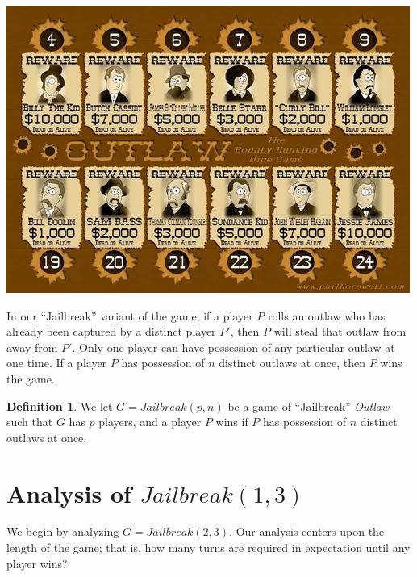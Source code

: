 \documentclass{article}
\theoremstyle{definition}
\newtheorem{defn}{Definition}
\theoremstyle{plain}
\begin{document}
	\begin{center}
	\includegraphics[scale=0.5]{outlaw_board}
	\end{center}
	
	In our ``Jailbreak'' variant of the game, if a player $P$ rolls an outlaw who has already been captured by a distinct player $P'$, then $P$ will steal that outlaw from away from $P'$. Only one player can have possession of any particular outlaw at one time. If a player $P$ has possession of $n$ distinct outlaws at once, then $P$ wins the game.
	
	\begin{defn}
	We let $G = Jailbreak(p, n)$ be  a game of ``Jailbreak'' \textit{Outlaw} such that $G$ has $p$ players, and a player $P$ wins if $P$ has possession of $n$ distinct outlaws at once.
	\end{defn}
	
	\section{Analysis of $Jailbreak(1, 3)$}

	We begin by analyzing $G = Jailbreak(2, 3)$. Our analysis centers upon the length of the game; that is, how many turns are required in expectation until any player wins?
\end{document}
